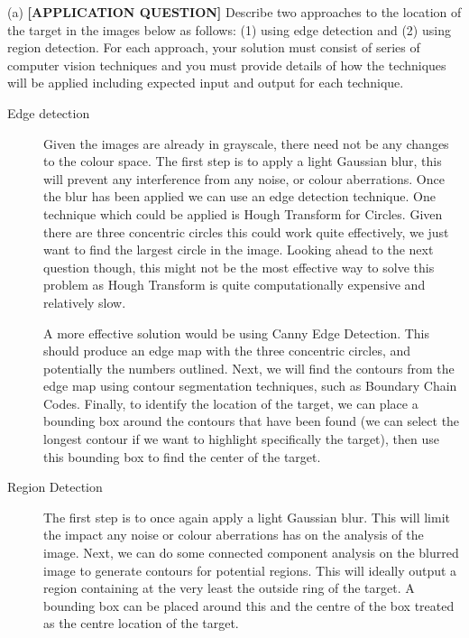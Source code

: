 \begin{tcolorbox}[title=Question]
  (a) \textbf{[APPLICATION QUESTION]} Describe two approaches to the location of the target in the images below as follows: (1) using edge detection and (2) using region detection. For each approach, your solution must consist of series of computer vision techniques and you must provide details of how the techniques will be applied including expected input and output for each technique.
  {\begin{flushright}
    [35 marks]
  \end{flushright}}
\end{tcolorbox}
\begin{description}
  \item[Edge detection] Given the images are already in grayscale, there need not be any changes to the colour space. The first step is to apply a light Gaussian blur, this will prevent any interference from any noise, or colour aberrations. Once the blur has been applied we can use an edge detection technique. One technique which could be applied is Hough Transform for Circles. Given there are three concentric circles this could work quite effectively, we just want to find the largest circle in the image. Looking ahead to the next question though, this might not be the most effective way to solve this problem as Hough Transform is quite computationally expensive and relatively slow.
  
  A more effective solution would be using Canny Edge Detection. This should produce an edge map with the three concentric circles, and potentially the numbers outlined. Next, we will find the contours from the edge map using contour segmentation techniques, such as Boundary Chain Codes. Finally, to identify the location of the target, we can place a bounding box around the contours that have been found (we can select the longest contour if we want to highlight specifically the target), then use this bounding box to find the center of the target.
  \item[Region Detection] The first step is to once again apply a light Gaussian blur. This will limit the impact any noise or colour aberrations has on the analysis of the image. Next, we can do some connected component analysis on the blurred image to generate contours for potential regions. This will ideally output a region containing at the very least the outside ring of the target. A bounding box can be placed around this and the centre of the box treated as the centre location of the target.
\end{description}

